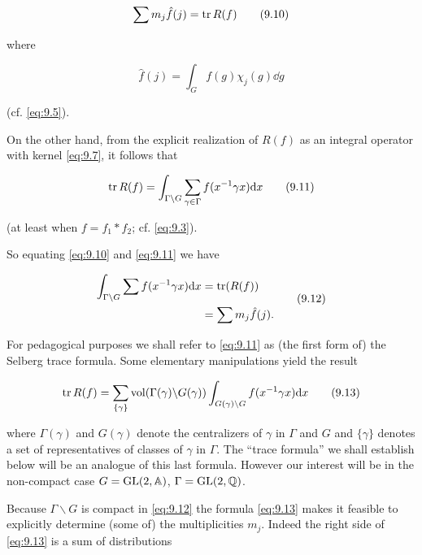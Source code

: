 \begin{equation}\label{eq:9.10}
\sum m_j \hat{f}(j) = \operatorname{tr} R(f)\tag{9.10}
\end{equation}

where

\[
\hat{f}(j) = \int_G f(g)\chi_j(g)\dd g
\]

(cf. \eqref{eq:9.5}).

On the other hand, from the explicit realization of $R(f)$ as an integral operator with kernel \eqref{eq:9.7}, it follows that

\begin{equation}\label{eq:9.11}
\operatorname{tr} R(f) = \int_{\Gamma \backslash G} \sum_{\gamma \in \Gamma} f(x^{-1}\gamma x)\mathrm{d} x\tag{9.11}
\end{equation}

(at least when $f = f_1 * f_2$; cf. \eqref{eq:9.3}).

So equating \eqref{eq:9.10} and \eqref{eq:9.11} we have

\begin{equation}\label{eq:9.12}
\begin{aligned}
\int_{\Gamma \backslash G} \sum f(x^{-1}\gamma x)\mathrm{d} x &= \operatorname{tr}(R(f))\\
&= \sum m_j \hat{f}(j).
\end{aligned}\tag{9.12}
\end{equation}

For pedagogical purposes we shall refer to \eqref{eq:9.11} as (the first form of) the Selberg trace formula. Some elementary manipulations yield the result

\begin{equation}\label{eq:9.13}
\operatorname{tr} R(f) = \sum_{\{\gamma\}} \operatorname{vol}(\Gamma(\gamma) \backslash G(\gamma)) \int_{G(\gamma) \backslash G} f(x^{-1}\gamma x)\mathrm{d} x\tag{9.13}
\end{equation}

where $\Gamma(\gamma)$ and $G(\gamma)$ denote the centralizers of $\gamma$ in $\Gamma$ and $G$ and $\{\gamma\}$ denotes a set of representatives of classes of $\gamma$ in $\Gamma$. The ``trace formula'' we shall establish below will be an analogue of this last formula. However our interest will be in the non-compact case $G = \operatorname{GL}(2,\mathbb{A})$, $\Gamma = \operatorname{GL}(2,\mathbb{Q})$.

Because $\Gamma \backslash G$ is compact in \eqref{eq:9.12} the formula \eqref{eq:9.13} makes it feasible to explicitly determine (some of) the multiplicities $m_j$. Indeed the right side of \eqref{eq:9.13} is a sum of distributions

